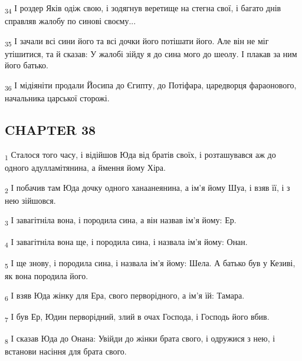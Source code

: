 \begin{tcolorbox}
\textsubscript{34} І роздер Яків одіж свою, і зодягнув веретище на стегна свої, і багато днів справляв жалобу по синові своєму...
\end{tcolorbox}
\begin{tcolorbox}
\textsubscript{35} І зачали всі сини його та всі дочки його потішати його. Але він не міг утішитися, та й сказав: У жалобі зійду я до сина мого до шеолу. І плакав за ним його батько.
\end{tcolorbox}
\begin{tcolorbox}
\textsubscript{36} І мідіяніти продали Йосипа до Єгипту, до Потіфара, царедворця фараонового, начальника царської сторожі.
\end{tcolorbox}
\subsection{CHAPTER 38}
\begin{tcolorbox}
\textsubscript{1} Сталося того часу, і відійшов Юда від братів своїх, і розташувався аж до одного адулламітянина, а ймення йому Хіра.
\end{tcolorbox}
\begin{tcolorbox}
\textsubscript{2} І побачив там Юда дочку одного ханаанеянина, а ім'я йому Шуа, і взяв її, і з нею зійшовся.
\end{tcolorbox}
\begin{tcolorbox}
\textsubscript{3} І завагітніла вона, і породила сина, а він назвав ім'я йому: Ер.
\end{tcolorbox}
\begin{tcolorbox}
\textsubscript{4} І завагітніла вона ще, і породила сина, і назвала ім'я йому: Онан.
\end{tcolorbox}
\begin{tcolorbox}
\textsubscript{5} І ще знову, і породила сина, і назвала ім'я йому: Шела. А батько був у Кезиві, як вона породила його.
\end{tcolorbox}
\begin{tcolorbox}
\textsubscript{6} І взяв Юда жінку для Ера, свого перворідного, а ім'я їй: Тамара.
\end{tcolorbox}
\begin{tcolorbox}
\textsubscript{7} І був Ер, Юдин перворідний, злий в очах Господа, і Господь його вбив.
\end{tcolorbox}
\begin{tcolorbox}
\textsubscript{8} І сказав Юда до Онана: Увійди до жінки брата свого, і одружися з нею, і встанови насіння для брата свого.
\end{tcolorbox}
